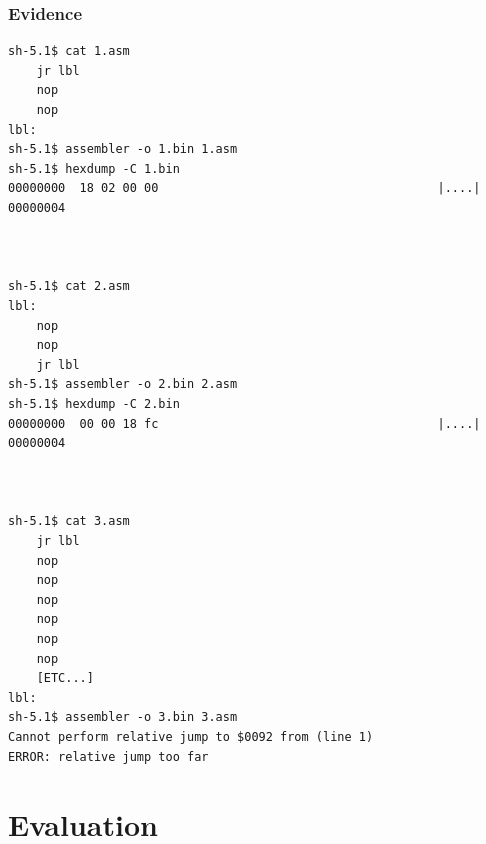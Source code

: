 \documentclass[a4paper]{report}
\begin{document}
\begin{table}[H]
\end{table}

\subsection{Evidence}

\begin{lstlisting}
sh-5.1$ cat 1.asm
	jr lbl
	nop
	nop
lbl:
sh-5.1$ assembler -o 1.bin 1.asm
sh-5.1$ hexdump -C 1.bin
00000000  18 02 00 00                                       |....|
00000004



sh-5.1$ cat 2.asm
lbl:
	nop
	nop
	jr lbl
sh-5.1$ assembler -o 2.bin 2.asm
sh-5.1$ hexdump -C 2.bin
00000000  00 00 18 fc                                       |....|
00000004



sh-5.1$ cat 3.asm
	jr lbl
	nop
	nop
	nop
	nop
	nop
	nop
	[ETC...]
lbl:
sh-5.1$ assembler -o 3.bin 3.asm
Cannot perform relative jump to $0092 from (line 1)
ERROR: relative jump too far
\end{lstlisting}

\chapter{Evaluation}
\end{document}

